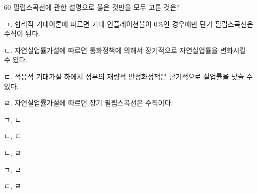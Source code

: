 \begin{question}{60}
필립스곡선에 관한 설명으로 옳은 것만을 모두 고른 것은?
\begin{framedtext}
ㄱ. 합리적 기대이론에 따르면 기대 인플레이션율이 0\%인 경우에만 단기 필립스곡선은 수직이 된다. \par
ㄴ. 자연실업률가설에 따르면 통화정책에 의해서 장기적으로 자연실업률을 변화시킬 수 있다. \par
ㄷ. 적응적 기대가설 하에서 정부의 재량적 안정화정책은 단기적으로 실업률을 낮출 수 있다. \par
ㄹ. 자연실업률가설에 따르면 장기 필립스곡선은 수직이다.
\end{framedtext}
\begin{choices}
  \item ㄱ, ㄴ
  \item ㄴ, ㄷ
  \item ㄴ, ㄹ
  \item ㄱ, ㄹ
  \item ㄷ, ㄹ
\end{choices}
\end{question}
